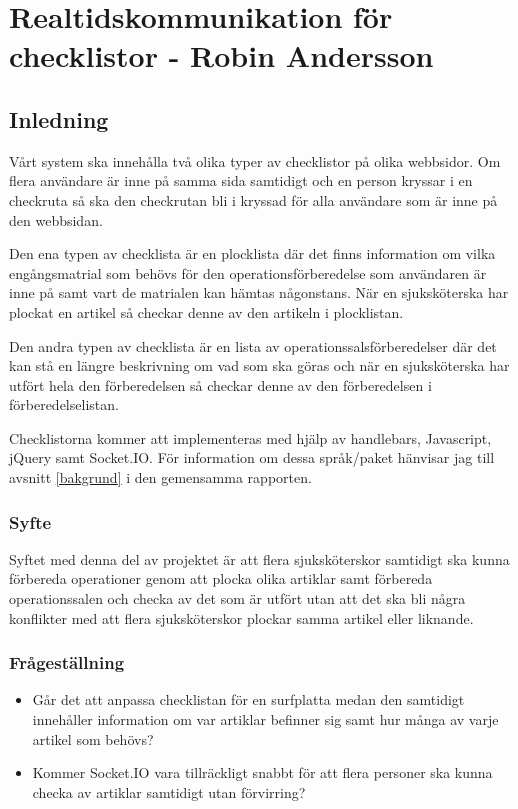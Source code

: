 \section{Realtidskommunikation för checklistor - Robin Andersson}
\subsection{Inledning}
Vårt system ska innehålla två olika typer av checklistor på olika webbsidor. Om flera användare är inne på samma sida samtidigt och en person kryssar i en checkruta så ska den checkrutan bli i kryssad för alla användare som är inne på den webbsidan.

Den ena typen av checklista är en plocklista där det finns information om vilka engångsmatrial som behövs för den operationsförberedelse som användaren är inne på samt vart de matrialen kan hämtas någonstans. När en sjuksköterska har plockat en artikel så checkar denne av den artikeln i plocklistan.

Den andra typen av checklista är en lista av operationssalsförberedelser där det kan stå en längre beskrivning om vad som ska göras och när en sjuksköterska har utfört hela den förberedelsen så checkar denne av den förberedelsen i förberedelselistan.

Checklistorna kommer att implementeras med hjälp av handlebars, Javascript, jQuery samt Socket.IO. För information om dessa språk/paket hänvisar jag till avsnitt \ref{bakgrund} i den gemensamma rapporten.

\subsubsection{Syfte}
Syftet med denna del av projektet är att flera sjuksköterskor samtidigt ska kunna förbereda operationer genom att plocka olika artiklar samt förbereda operationssalen och checka av det som är utfört utan att det ska bli några konflikter med att flera sjuksköterskor plockar samma artikel eller liknande.

\subsubsection{Frågeställning}
\begin{itemize}
\item Går det att anpassa checklistan för en surfplatta medan den samtidigt innehåller information om var artiklar befinner sig samt hur många av varje artikel som behövs?

\item Kommer Socket.IO vara tillräckligt snabbt för att flera personer ska kunna checka av artiklar samtidigt utan förvirring?
\end{itemize}

